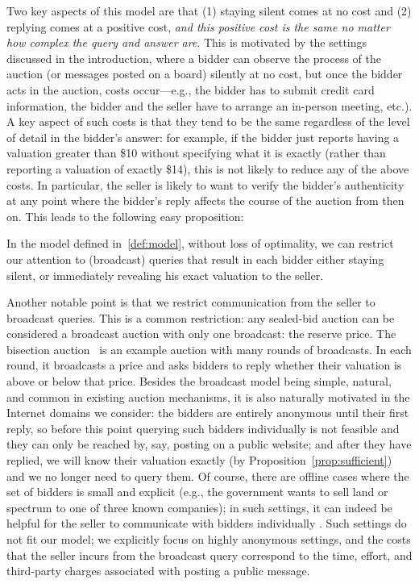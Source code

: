 Two key aspects of this model are that (1) staying silent comes at no cost
and (2) replying comes at a positive cost, {\em and this positive cost is
  the same no matter how complex the query and answer are}.  This is
motivated by the settings discussed in the introduction, where a bidder can
observe the process of the auction (or messages posted on a board) silently
at no cost, but once the bidder acts in the auction, costs occur---e.g., the
bidder has to submit credit card information, the bidder and the seller
have to arrange an in-person meeting, etc.).  A key aspect of such costs is
that they tend to be the same regardless of the level of detail in the
bidder's answer: for example, if the bidder just reports having a valuation
greater than \$10 without specifying what it is exactly (rather than
reporting a valuation of exactly \$14), this is not likely to reduce any of
the above costs.  In particular, the seller is likely to want to verify the
bidder's authenticity at any point where the bidder's reply affects the
course of the auction from then on.  
This leads to the following easy proposition:

\begin{proposition}
\label{prop:sufficient}
  In the model defined in~\ref{def:model}, without loss of optimality, we
  can restrict our attention to (broadcast) queries that result in each
  bidder either staying silent, or immediately revealing his exact
  valuation to the seller.
\end{proposition}

Another notable point is that we restrict communication from the seller to
broadcast queries.  This is a common restriction: any sealed-bid auction
can be considered a broadcast auction with only one broadcast: the reserve
price.  The bisection auction~\cite{Herings2009:BisectionAuction} is an
example auction with many rounds of broadcasts. In each round, it
broadcasts a price and asks bidders to reply whether their valuation is
above or below that price.  Besides the broadcast model being simple,
natural, and common in existing auction mechanisms, it is also naturally
motivated in the Internet domains we consider: the bidders are entirely
anonymous until their first reply, so before this point querying such
bidders individually is not feasible and they can only be reached by, say,
posting on a public website; and after they have replied, we will know
their valuation exactly (by Proposition~\ref{prop:sufficient}) and we no
longer need to query them.  Of course, there are offline cases where the
set of bidders is small and explicit (e.g., the government wants to sell
land or spectrum to one of three known companies); in such settings, it can
indeed be helpful for the seller to communicate with bidders individually
\cite{McAfee88:SearchMechanisms,Sandholm06:Sequences}.  Such settings do
not fit our model; we explicitly focus on highly anonymous settings, and
the costs that the seller incurs from the broadcast query correspond to the
time, effort, and third-party charges associated with posting a public
message.


